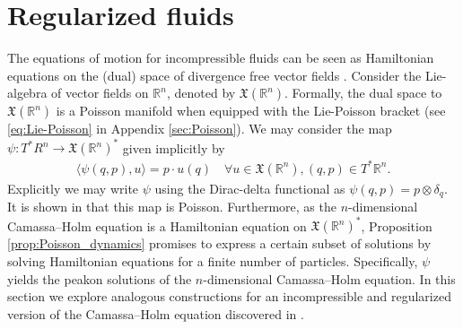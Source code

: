 \documentclass[12pt]{amsart}
\begin{document}
\section{Regularized fluids}
  The equations of motion for incompressible fluids can be seen as
  Hamiltonian equations on the (dual) space of divergence
  free vector fields \cite{Arnold1966}.
  Consider the Lie-algebra of vector fields on $\mathbb{R}^n$, 
  denoted by $\mathfrak{X}(\mathbb{R}^n)$.
  Formally, the dual space to $\mathfrak{X}(\mathbb{R}^n)$ is a Poisson
  manifold when equipped with the Lie-Poisson bracket
  (see \eqref{eq:Lie-Poisson} in Appendix \ref{sec:Poisson}).
  We may consider the map
  $\psi: T^*R^n \to \mathfrak{X}(\mathbb{R}^n)^*$
  given implicitly by
  \begin{align*}
    \langle \psi(q,p) , u \rangle = p \cdot u(q) \quad
    \forall u \in \mathfrak{X}(\mathbb{R}^n), (q,p) \in T^*\mathbb{R}^n.
  \end{align*}
  Explicitly we may write $\psi$ using the Dirac-delta
  functional as $\psi(q,p) = p \otimes \delta_q$.
  It is shown in \cite{HolmMarsden2005} that this map is Poisson.
  Furthermore, as the $n$-dimensional Camassa--Holm equation \cite{CamassaHolm1993} is a
  Hamiltonian equation on $\mathfrak{X}(\mathbb{R}^n)^*$,
  Proposition \ref{prop:Poisson_dynamics} promises to express a 
  certain subset
  of solutions by solving Hamiltonian equations for a finite number
  of particles.
  Specifically, $\psi$ yields the peakon solutions of the $n$-dimensional
  Camassa--Holm equation.
  In this section we explore analogous constructions for
  an incompressible and regularized version of the
  Camassa--Holm equation discovered in \cite{MumfordMichor2013}.
\end{document}
